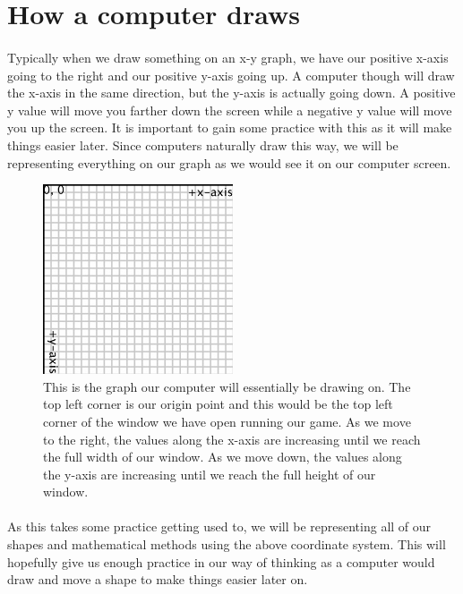 \documentclass[12pt, letterpaper]{report}
\begin{document}
	\section{How a computer draws}
	\paragraph{} Typically when we draw something on an x-y graph, we have our positive x-axis going to the right and our positive y-axis going up. A computer though will draw the x-axis in the same direction, but the y-axis is actually going down. A positive y value will move you farther down the screen while a negative y value will move you up the screen. It is important to gain some practice with this as it will make things easier later. Since computers naturally draw this way, we will be representing everything on our graph as we would see it on our computer screen. 
\\
	\begin{figure}[ht]
	\centering
	\includegraphics[width=0.5\textwidth]{Processing Images/ComputerAxes/ComputerAxes.jpg}
	\caption{This is the graph our computer will essentially be drawing on. The top left corner is our origin point and this would be the top left corner of the window we have open running our game. As we move to the right, the values along the x-axis are increasing until we reach the full width of our window. As we move down, the values along the y-axis are increasing until we reach the full height of our window.}
	\end{figure}
	\paragraph{} As this takes some practice getting used to, we will be representing all of our shapes and mathematical methods using the above coordinate system. This will hopefully give us enough practice in our way of thinking as a computer would draw and move a shape to make things easier later on.
\end{document}
